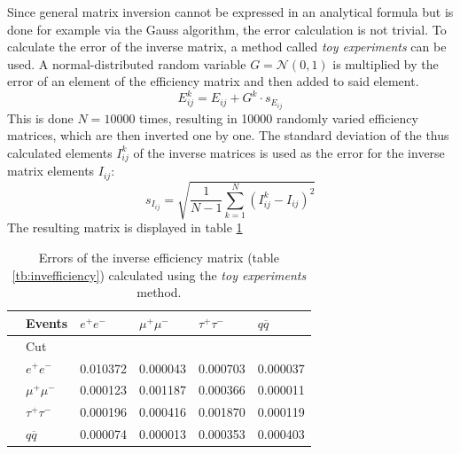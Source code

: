 Since general matrix inversion cannot be expressed in an analytical formula but is done for example via the Gauss algorithm, the error calculation is not trivial. To calculate the error of the inverse matrix, a method called \emph{toy experiments} can be used. A normal-distributed random variable $G=\mathcal{N}(0,1)$ is multiplied by the error of an element of the efficiency matrix and then added to said element.
\begin{equation}
E^{k}_{ij}=E_{ij}+G^k\cdot s_{E_{ij}}
\end{equation}
This is done $N=10000$ times, resulting in 10000 randomly varied efficiency matrices, which are then inverted one by one. The standard deviation of the thus calculated elements $I^k_{ij}$ of the inverse matrices is used as the error for the inverse matrix elements $I_{ij}$: 
\begin{equation}
s_{I_{ij}}=\sqrt{\frac{1}{N-1}\sum_{k=1}^{N}\left(I^k_{ij}-I_{ij}\right)^2}
\end{equation}
The resulting matrix is displayed in table \ref{tb:invefficiencyerror}
\begin{table}[H]\centering
	\begin{tabular}{@{}llllll@{}}
		\toprule
		&Events &$e^+e^-$&$\mu^+\mu^-$&$\tau^+\tau^-$&$q\overline{q}$\\
		\midrule
		&Cut&&&&\\
		&$e^+e^-$&0.010372&0.000043&0.000703&0.000037\\
		&$\mu^+\mu^-$&0.000123&0.001187&0.000366&0.000011\\
		&$\tau^+\tau^-$&0.000196&0.000416&0.001870&0.000119\\
		&$q\overline{q}$&0.000074&0.000013&0.000353&0.000403\\
		\bottomrule
	\end{tabular}
	\caption[Inverse efficiency error matrix]{Errors of the inverse efficiency matrix (table \ref{tb:invefficiency}) calculated using the \emph{toy experiments} method.}
	\label{tb:invefficiencyerror}
\end{table}

